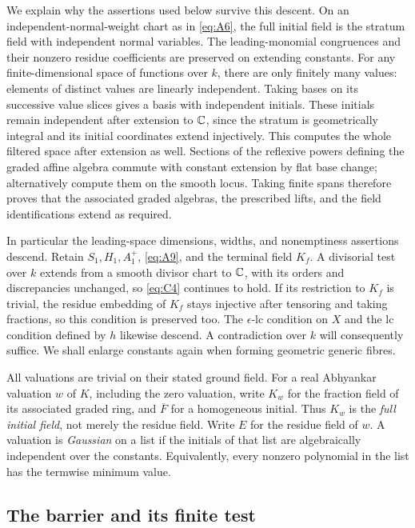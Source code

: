 We explain why the assertions used below survive this descent.
On an independent-normal-weight chart as in \eqref{eq:A6}, the full
initial field is the stratum field with independent normal variables.
The leading-monomial congruences and their nonzero residue coefficients
are preserved on extending constants.  For any finite-dimensional
space of functions over \(k\), there are only finitely many values:
elements of distinct values are linearly independent.  Taking bases
on its successive value slices gives a basis with independent initials.
These initials remain independent after extension to \(\mathbb C\), since
the stratum is geometrically integral and its initial coordinates
extend injectively.  This computes the whole filtered space after
extension as well.  Sections of the reflexive powers defining the
graded affine algebra commute with constant extension by flat base
change; alternatively compute them on the smooth locus.  Taking
finite spans therefore proves that the associated graded algebras,
the prescribed lifts, and the field identifications extend as required.

In particular the leading-space dimensions, widths, and nonemptiness
assertions descend.  Retain \(S_1,H_1,A_1^+\), \eqref{eq:A9}, and the
terminal field \(K_f\).  A divisorial test over \(k\) extends from a
smooth divisor chart to \(\mathbb C\), with its orders and discrepancies
unchanged, so \eqref{eq:C4} continues to hold.  If its restriction to
\(K_f\) is trivial, the residue embedding of \(K_f\) stays injective
after tensoring and taking fractions, so this condition is preserved
too.  The \(\epsilon\)-lc condition on \(X\) and the lc condition
defined by \(h\) likewise descend.  A contradiction over \(k\)
will consequently suffice.  We shall enlarge constants again when
forming geometric generic fibres.

All valuations are trivial on their stated ground field.  For a real
Abhyankar valuation \(w\) of \(K\), including the zero valuation,
write \(K_w\) for the fraction field of its associated graded ring,
and \(\overline F\) for a homogeneous initial.  Thus \(K_w\) is the
\emph{full initial field}, not merely the residue field.  Write \(E\)
for the residue field of \(w\).  A valuation is \emph{Gaussian} on a
list if the initials of that list are algebraically independent over
the constants.  Equivalently, every nonzero polynomial in the list
has the termwise minimum value.

\subsection{The barrier and its finite test}

